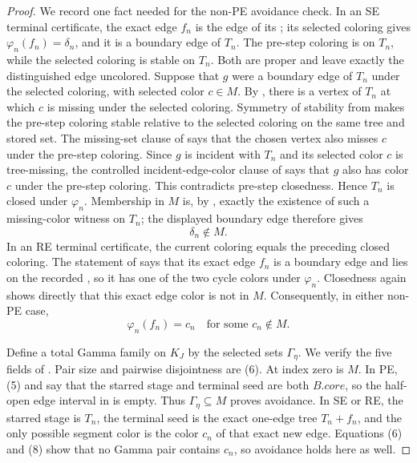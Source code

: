 \begin{proof}
We record one fact needed for the non-PE avoidance check.  In an SE
terminal certificate, the exact edge $f_n$ is the edge of its
; its selected coloring gives
$\varphi_n(f_n)=\delta_n$, and it is a boundary edge of $T_n$.  The
pre-step coloring is  on $T_n$, while the
selected coloring is stable on $T_n$.  Both are proper and leave exactly
the distinguished edge uncolored.  Suppose that $g$ were a boundary edge
of $T_n$ under the selected coloring, with selected color $c\in M$.
By , there is a vertex of $T_n$ at which $c$ is
missing under the selected coloring.  Symmetry of stability from
 makes the pre-step coloring stable relative to the selected
coloring on the same tree and stored set.  The missing-set clause of
 says that the chosen vertex also misses $c$ under
the pre-step coloring.  Since $g$ is incident with $T_n$ and its selected
color $c$ is tree-missing, the controlled incident-edge-color clause of
 says that $g$ also has color $c$ under the pre-step
coloring.  This contradicts pre-step closedness.  Hence $T_n$ is closed
under $\varphi_n$.  Membership in $M$ is, by
, exactly the existence of such a missing-color
witness on $T_n$; the displayed boundary edge therefore gives
\[
                         \delta_n\notin M.                    \tag{7}
\]
In an RE terminal certificate, the current coloring equals the preceding
closed coloring.  The statement of
 says that its exact edge $f_n$
is a boundary edge and lies on the recorded , so it has one of the two cycle colors under
$\varphi_n$.  Closedness again shows directly that this exact edge color
is not in $M$.  Consequently, in either non-PE case,
\[
                  \varphi_n(f_n)=c_n\quad\text{for some }c_n\notin M.
                                                                    \tag{8}
\]

Define a total Gamma family on $K_J$ by the selected sets
$\Gamma_\eta$.  We verify the five fields of
.  Pair size and pairwise disjointness are (6).
At index zero  is $M$.  In PE, (5)
and  say that the starred stage and
terminal seed are both $B.\mathit{core}$, so the
half-open edge interval in
 is empty.  Thus
$\Gamma_\eta\subseteq M$ proves avoidance.  In SE or RE, the starred
stage is $T_n$, the terminal seed is the exact one-edge tree $T_n+f_n$,
and the only possible segment color is the color $c_n$ of that exact new
edge.  Equations (6) and (8) show that no Gamma pair contains $c_n$, so
avoidance holds here as well.


\end{proof}
